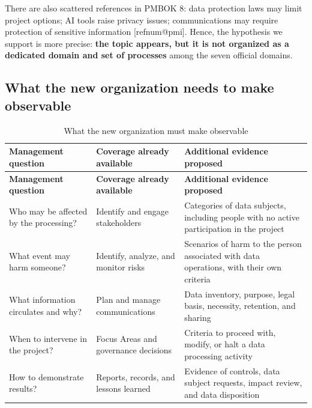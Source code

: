 \documentclass[12pt,a4paper,article,oneside,brazil,english]{abntex2}
\makeatletter
\newcommand{\fontetab}[1]{\par\vspace{3pt}{\small\noindent Source: #1\par}}
\newcommand{\refnum}[1]{\csname refnum@#1\endcsname}
\makeatother
\begin{document}
There are also scattered references in PMBOK 8: data protection laws may limit project options; AI tools raise privacy issues; communications may require protection of sensitive information [\refnum{pmi}]. Hence, the hypothesis we support is more precise: \textbf{the topic appears, but it is not organized as a dedicated domain and set of processes} among the seven official domains.
\subsection{What the new organization needs to make observable}

\begingroup\SingleSpacing\small
\begin{longtable}{@{}>{\raggedright\arraybackslash}p{}>{\raggedright\arraybackslash}p{}>{\raggedright\arraybackslash}p{}@{}}
\caption{What the new organization must make observable}\label{tab:t1}\\
\hline
\textbf{Management question} & \textbf{Coverage already available} & \textbf{Additional evidence proposed}\\
\hline
\endfirsthead
\hline
\textbf{Management question} & \textbf{Coverage already available} & \textbf{Additional evidence proposed}\\
\hline
\endhead
\hline
\endfoot
\hline
\endlastfoot
Who may be affected by the processing? & Identify and engage stakeholders & Categories of data subjects, including people with no active participation in the project\\[3pt]
What event may harm someone? & Identify, analyze, and monitor risks & Scenarios of harm to the person associated with data operations, with their own criteria\\[3pt]
What information circulates and why? & Plan and manage communications & Data inventory, purpose, legal basis, necessity, retention, and sharing\\[3pt]
When to intervene in the project? & Focus Areas and governance decisions & Criteria to proceed with, modify, or halt a data processing activity\\[3pt]
How to demonstrate results? & Reports, records, and lessons learned & Evidence of controls, data subject requests, impact review, and data disposition\\[3pt]
\end{longtable}
\endgroup
\fontetab{Prepared by the authors (2026).}
\end{document}
